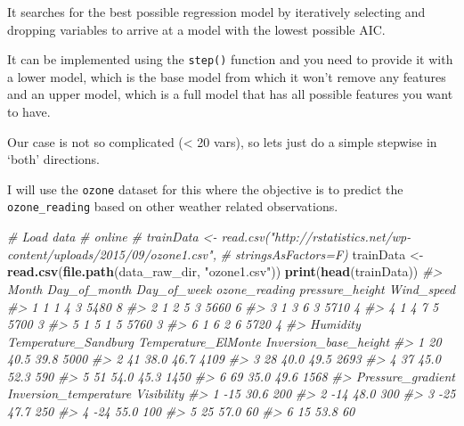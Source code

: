 \documentclass[]{book}
\newenvironment{Shaded}{\begin{snugshade}}{\end{snugshade}}
\newcommand{\CommentTok}[1]{\textcolor[rgb]{0.56,0.35,0.01}{\textit{#1}}}
\newcommand{\KeywordTok}[1]{\textcolor[rgb]{0.13,0.29,0.53}{\textbf{#1}}}
\newcommand{\NormalTok}[1]{#1}
\newcommand{\StringTok}[1]{\textcolor[rgb]{0.31,0.60,0.02}{#1}}
\begin{document}
It searches for the best possible regression model by iteratively selecting and dropping variables to arrive at a model with the lowest possible AIC.

It can be implemented using the \texttt{step()} function and you need to provide it with a lower model, which is the base model from which it won't remove any features and an upper model, which is a full model that has all possible features you want to have.

Our case is not so complicated (\textless{} 20 vars), so lets just do a simple stepwise in `both' directions.

I will use the \texttt{ozone} dataset for this where the objective is to predict the \texttt{ozone\_reading} based on other weather related observations.

\begin{Shaded}
\begin{Highlighting}[]
\CommentTok{# Load data}
\CommentTok{# online}
\CommentTok{# trainData <- read.csv("http://rstatistics.net/wp-content/uploads/2015/09/ozone1.csv",}
\CommentTok{#                      stringsAsFactors=F)}
\NormalTok{trainData <-}\StringTok{ }\KeywordTok{read.csv}\NormalTok{(}\KeywordTok{file.path}\NormalTok{(data_raw_dir, }\StringTok{"ozone1.csv"}\NormalTok{))}
\KeywordTok{print}\NormalTok{(}\KeywordTok{head}\NormalTok{(trainData))}
\CommentTok{#>   Month Day_of_month Day_of_week ozone_reading pressure_height Wind_speed}
\CommentTok{#> 1     1            1           4             3            5480          8}
\CommentTok{#> 2     1            2           5             3            5660          6}
\CommentTok{#> 3     1            3           6             3            5710          4}
\CommentTok{#> 4     1            4           7             5            5700          3}
\CommentTok{#> 5     1            5           1             5            5760          3}
\CommentTok{#> 6     1            6           2             6            5720          4}
\CommentTok{#>   Humidity Temperature_Sandburg Temperature_ElMonte Inversion_base_height}
\CommentTok{#> 1       20                 40.5                39.8                  5000}
\CommentTok{#> 2       41                 38.0                46.7                  4109}
\CommentTok{#> 3       28                 40.0                49.5                  2693}
\CommentTok{#> 4       37                 45.0                52.3                   590}
\CommentTok{#> 5       51                 54.0                45.3                  1450}
\CommentTok{#> 6       69                 35.0                49.6                  1568}
\CommentTok{#>   Pressure_gradient Inversion_temperature Visibility}
\CommentTok{#> 1               -15                  30.6        200}
\CommentTok{#> 2               -14                  48.0        300}
\CommentTok{#> 3               -25                  47.7        250}
\CommentTok{#> 4               -24                  55.0        100}
\CommentTok{#> 5                25                  57.0         60}
\CommentTok{#> 6                15                  53.8         60}
\end{Highlighting}
\end{Shaded}
\end{document}
